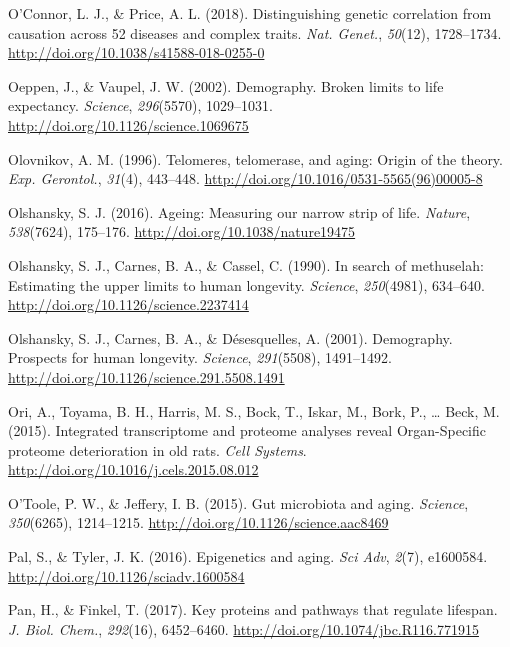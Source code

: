 \documentclass[12pt,twoside]{unicam}
\begin{document}
\begin{cslreferences}
\leavevmode\hypertarget{ref-OConnor2018}{}%
O'Connor, L. J., \& Price, A. L. (2018). Distinguishing genetic correlation from causation across 52 diseases and complex traits. \emph{Nat. Genet.}, \emph{50}(12), 1728--1734. \url{http://doi.org/10.1038/s41588-018-0255-0}

\leavevmode\hypertarget{ref-Oeppen2002}{}%
Oeppen, J., \& Vaupel, J. W. (2002). Demography. Broken limits to life expectancy. \emph{Science}, \emph{296}(5570), 1029--1031. \url{http://doi.org/10.1126/science.1069675}

\leavevmode\hypertarget{ref-Olovnikov1996}{}%
Olovnikov, A. M. (1996). Telomeres, telomerase, and aging: Origin of the theory. \emph{Exp. Gerontol.}, \emph{31}(4), 443--448. \url{http://doi.org/10.1016/0531-5565(96)00005-8}

\leavevmode\hypertarget{ref-Olshansky2016}{}%
Olshansky, S. J. (2016). Ageing: Measuring our narrow strip of life. \emph{Nature}, \emph{538}(7624), 175--176. \url{http://doi.org/10.1038/nature19475}

\leavevmode\hypertarget{ref-Olshansky1990}{}%
Olshansky, S. J., Carnes, B. A., \& Cassel, C. (1990). In search of methuselah: Estimating the upper limits to human longevity. \emph{Science}, \emph{250}(4981), 634--640. \url{http://doi.org/10.1126/science.2237414}

\leavevmode\hypertarget{ref-Olshansky2001}{}%
Olshansky, S. J., Carnes, B. A., \& Désesquelles, A. (2001). Demography. Prospects for human longevity. \emph{Science}, \emph{291}(5508), 1491--1492. \url{http://doi.org/10.1126/science.291.5508.1491}

\leavevmode\hypertarget{ref-Ori2015}{}%
Ori, A., Toyama, B. H., Harris, M. S., Bock, T., Iskar, M., Bork, P., \ldots{} Beck, M. (2015). Integrated transcriptome and proteome analyses reveal Organ-Specific proteome deterioration in old rats. \emph{Cell Systems}. \url{http://doi.org/10.1016/j.cels.2015.08.012}

\leavevmode\hypertarget{ref-OToole2015}{}%
O'Toole, P. W., \& Jeffery, I. B. (2015). Gut microbiota and aging. \emph{Science}, \emph{350}(6265), 1214--1215. \url{http://doi.org/10.1126/science.aac8469}

\leavevmode\hypertarget{ref-Pal2016}{}%
Pal, S., \& Tyler, J. K. (2016). Epigenetics and aging. \emph{Sci Adv}, \emph{2}(7), e1600584. \url{http://doi.org/10.1126/sciadv.1600584}

\leavevmode\hypertarget{ref-Pan2017}{}%
Pan, H., \& Finkel, T. (2017). Key proteins and pathways that regulate lifespan. \emph{J. Biol. Chem.}, \emph{292}(16), 6452--6460. \url{http://doi.org/10.1074/jbc.R116.771915}


\end{cslreferences}
\end{document}
